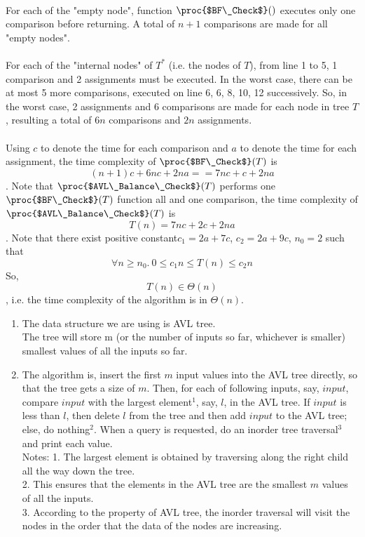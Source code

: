 \documentclass[11pt, answers]{exam}
\theoremstyle{plain}
\theoremstyle{definition}
\begin{document}
\begin{questions}
\begin{solution}
\\
For each of the "empty node", function $\proc{$BF\_Check$}()$ executes only one comparison before returning. A total of $n+1$ comparisons are made for all "empty nodes".\\
\\
For each of the "internal nodes" of $T^*$ (i.e. the nodes of $T$), from line 1 to 5, 1 comparison and 2 assignments must be executed. In the worst case, there can be at most 5 more comparisons, executed on line 6, 6, 8, 10, 12 successively. So, in the worst case, 2 assignments and 6 comparisons are made for each node in tree $T$, resulting a total of $6n$ comparisons and $2n$ assignments.\\
\\
Using $c$ to denote the time for each comparison and $a$ to denote the time for each assignment, the time complexity of $\proc{$BF\_Check$}(T)$ is $$(n+1)c+6nc+2na == 7nc+c+2na$$. Note that $\proc{$AVL\_Balance\_Check$}(T)$ performs one $\proc{$BF\_Check$}(T)$ function all and one comparison, the time complexity of $\proc{$AVL\_Balance\_Check$}(T)$ is $$T(n) = 7nc+2c+2na$$.
Note that there exist positive constant$c_1=2a+7c$, $c_2=2a+9c$, $n_0=2$ such that $$\forall n\geq n_0 .\  0\leq c_1n \leq T(n) \leq c_2n$$
So, $$T(n) \in \Theta(n)$$, i.e. the time complexity of the algorithm is in $\Theta(n)$.
\end{solution}

\question
\begin{solution}
\begin{enumerate}
\item The data structure we are using is AVL tree. \\
The tree will store m (or the number of inputs so far, whichever is smaller) smallest values of all the inputs so far.

\item The algorithm is, insert the first $m$ input values into the AVL tree directly, so that the tree gets a size of $m$. Then, for each of following inputs, say, $input$, compare $input$ with the largest element$^1$, say, $l$, in the AVL tree. If $input$ is less than $l$, then delete $l$ from the tree and then add $input$ to the AVL tree; else, do nothing$^2$. When a query is requested, do an inorder tree traversal$^3$ and print each value.\\
Notes: 
1. The largest element is obtained by traversing along the right child all the way down the tree.\\
2. This ensures that the elements in the AVL tree are the smallest $m$ values of all the inputs. \\
3.  According to the property of AVL tree, the inorder traversal will visit the nodes in the order that the data of the nodes are increasing.\\


\end{enumerate}
\end{solution}
\end{questions}
\end{document}
